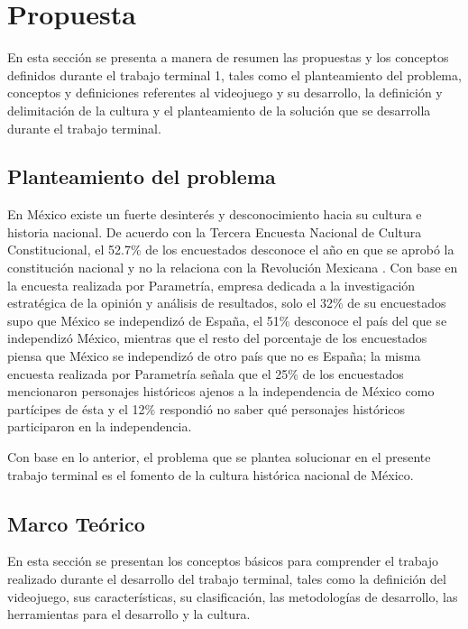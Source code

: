 \section{Propuesta}
En esta sección se presenta a manera de resumen las propuestas y los conceptos
definidos durante el trabajo terminal 1, tales como el planteamiento del problema,
conceptos y definiciones referentes al videojuego y su desarrollo, la definición
y delimitación de la cultura y el planteamiento de la solución que se desarrolla
durante el trabajo terminal.  

\subsection{Planteamiento del problema}
En México existe un fuerte desinterés y desconocimiento hacia su cultura e historia
nacional. De acuerdo con la Tercera Encuesta Nacional de Cultura Constitucional,
el 52.7\% de los encuestados desconoce el año en que se aprobó la constitución
nacional y no la relaciona con la Revolución Mexicana \cite{RefConsti}. Con base
en la encuesta realizada por Parametría, empresa dedicada a la investigación
estratégica de la opinión y análisis de resultados, solo el 32\% de su encuestados
supo que México se independizó de España, el 51\% desconoce el país del que se
independizó México, mientras que el resto del porcentaje de los encuestados
piensa que México se independizó de otro país que no es España; la misma
encuesta realizada por Parametría señala que el 25\% de los encuestados mencionaron
personajes históricos ajenos a la independencia de México como partícipes de
ésta y el 12\% respondió no saber qué personajes históricos participaron en la
independencia\cite{RefParametria}.
 \\
\par
Con base en lo anterior, el problema que se plantea solucionar en el presente 
trabajo terminal es el fomento de la cultura histórica nacional de México.
\subsection{Marco Teórico}
En esta sección se presentan los conceptos básicos para comprender el trabajo
realizado durante el desarrollo del trabajo terminal, tales como la definición
del videojuego, sus características, su clasificación, las metodologías de
desarrollo, las herramientas para el desarrollo y la cultura.

